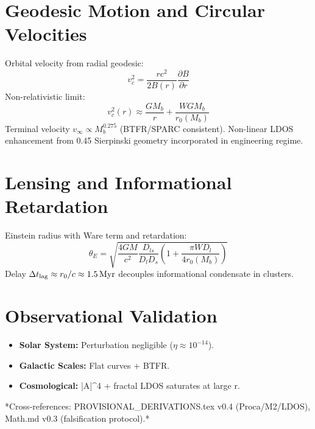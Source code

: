 \documentclass[12pt,a4paper]{article}
\begin{document}
\section{Geodesic Motion and Circular Velocities}
Orbital velocity from radial geodesic:
\begin{equation}
v_c^2 = \frac{r c^2}{2 B(r)} \frac{\partial B}{\partial r}
\end{equation}
Non-relativistic limit:
\begin{equation}
v_c^2(r) \approx \frac{G M_b}{r} + \frac{W G M_b}{r_0(M_b)}
\end{equation}
Terminal velocity \( v_\infty \propto M_b^{0.275} \) (BTFR/SPARC consistent). Non-linear LDOS enhancement from 0.45 Sierpinski geometry incorporated in engineering regime.

\section{Lensing and Informational Retardation}
Einstein radius with Ware term and retardation:
\begin{equation}
\theta_E = \sqrt{ \frac{4 G M}{c^2} \frac{D_{ls}}{D_l D_s} \left(1 + \frac{\pi W D_l}{4 r_0(M_b)}\right) }
\end{equation}
Delay \( \Delta t_{\rm lag} \approx r_0/c \approx 1.5\,\si{Myr} \) decouples informational condensate in clusters.

\section{Observational Validation}
\begin{itemize}
    \item \textbf{Solar System:} Perturbation negligible (\( \eta \approx 10^{-14} \)).
    \item \textbf{Galactic Scales:} Flat curves + BTFR.
    \item \textbf{Cosmological:} |A|^4 + fractal LDOS saturates at large r.
\end{itemize}

*Cross-references: PROVISIONAL_DERIVATIONS.tex v0.4 (Proca/M2/LDOS), Math.md v0.3 (falsification protocol).*
\end{document}
